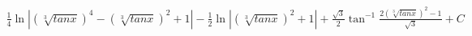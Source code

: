 \documentclass[preview]{standalone}
\begin{document}
\begin{align*}
\frac{1}{4}\ln|(\sqrt[3]{tanx})^4-(\sqrt[3]{tanx})^2+1|-\frac{1}{2}\ln|(\sqrt[3]{tanx})^2+1|+\frac{\sqrt3}{2}\tan^{-1}\frac{2(\sqrt[3]{tanx})^2-1}{\sqrt3}+C
\end{align*}
\end{document}
